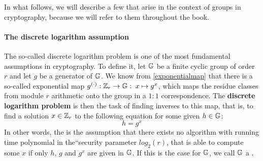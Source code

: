 In what follows, we will describe a few  that arise in the context of groups in cryptography, because we will refer to them throughout the book.
\paragraph{The discrete logarithm assumption} The so-called discrete logarithm problem is one of the most fundamental assumptions in cryptography. To define it, let $\mathbb{G}$ be a finite cyclic group of order $r$ and let $g$ be a generator of $\mathbb{G}$.  We know from \ref{exponentialmap} that there is a so-called exponential map 
$g^{(\cdot)}: \mathbb{Z}_r \to \mathbb{G}:\; x\mapsto g^x$, which maps the residue classes from module $r$ arithmetic onto the group in a $1:1$ correspondence. The \textbf{discrete logarithm problem} is then the task of finding inverses to this map, that is, to find a solution $x\in\mathbb{Z}_r$ to the following equation for some given $h\in\mathbb{G}$:
\begin{equation}
h = g^x
\end{equation}
In other words, the  is the assumption that there exists no algorithm with running time polynomial in the``security parameter $log_2(r)$, that is able to compute some $x$ if only $h$, $g$ and $g^x$ are given in $\mathbb{G}$. If this is the case for $\mathbb{G}$, we call $\mathbb{G}$ a .

